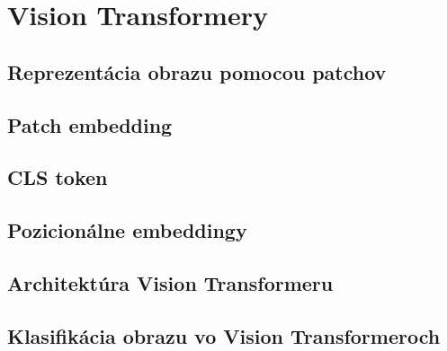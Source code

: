 \chapter{Vision Transformery}

\label{kap:vision_transformery}

\section{Reprezentácia obrazu pomocou patchov}

\section{Patch embedding}

\section{CLS token}

\section{Pozicionálne embeddingy}

\section{Architektúra Vision Transformeru}

\section{Klasifikácia obrazu vo Vision Transformeroch}